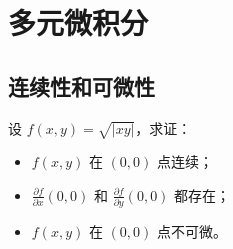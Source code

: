 \documentclass[lang=cn,10pt,thmcnt=section]{elegantbook}
\begin{document}
\chapter{多元微积分}
\section{连续性和可微性}
\begin{example}
    设 $f(x, y) = \sqrt{|xy|}$，求证：
\begin{itemize}
\item $f(x, y)$ 在 $(0, 0)$ 点连续；
\item $\frac{\partial f}{\partial x}(0, 0)$ 和 $\frac{\partial f}{\partial y}(0, 0)$ 都存在；
\item $f(x, y)$ 在 $(0, 0)$ 点不可微。
\end{itemize}
\end{example}
\end{document}
